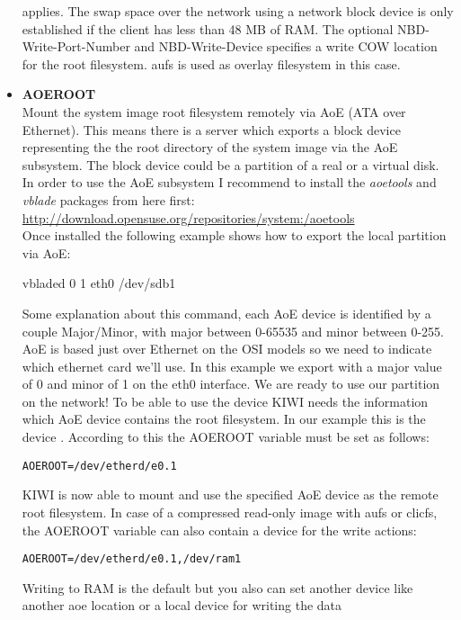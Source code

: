 \begin{itemize}
        applies. The swap space over the network using a network block device
        is only established if the client has less than 48 MB of RAM.
        The optional NBD-Write-Port-Number and NBD-Write-Device specifies
        a write COW location for the root filesystem. aufs is used as
        overlay filesystem in this case.
    \item \textbf{AOEROOT}\\
        Mount the system image root filesystem remotely via AoE
        (ATA over Ethernet). This means there is a server which
        exports a block device representing the the root directory of
        the system image via the AoE subsystem. The block device
        could be a partition of a real or a virtual disk. In order to
        use the AoE subsystem I recommend to install the \textit{aoetools}
        and \textit{vblade} packages from here first:
        \url{http://download.opensuse.org/repositories/system:/aoetools}\\
        Once installed the following example shows how to export
        the local  partition via AoE:
\begin{Command}
vbladed 0 1 eth0 /dev/sdb1
\end{Command}
        Some explanation about this command, each AoE device is identified
        by a couple Major/Minor, with major between 0-65535 and minor
        between 0-255. AoE is based just over Ethernet on the OSI models
        so we need to indicate which ethernet card we'll use. 
        In this example we export  with a major value of 0 and
        minor of 1 on the eth0 interface. We are ready to use our partition
        on the network! To be able to use the device KIWI needs the
        information which AoE device contains the root filesystem. In
        our example this is the device .
        According to this the AOEROOT variable must be set as follows:
\begin{verbatim}
AOEROOT=/dev/etherd/e0.1
\end{verbatim}
        KIWI is now able to mount and use the specified AoE device
        as the remote root filesystem. In case of a compressed read-only
        image with aufs or clicfs, the AOEROOT variable can also contain
        a device for the write actions:
\begin{verbatim}
AOEROOT=/dev/etherd/e0.1,/dev/ram1
\end{verbatim}
        Writing to RAM is the default but you also can set another device
        like another aoe location or a local device for writing the data

\end{itemize}

